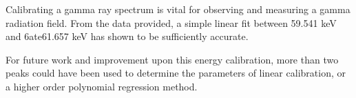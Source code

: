 Calibrating a gamma ray spectrum is vital for observing
and measuring a gamma radiation field. From the data
provided, a simple linear fit between 59.541 keV and 6ate61.657 keV
has shown to be sufficiently accurate.

For future work and improvement upon this energy calibration, more than
two peaks could have been used to determine the parameters of linear
calibration, or a higher order polynomial regression method.
